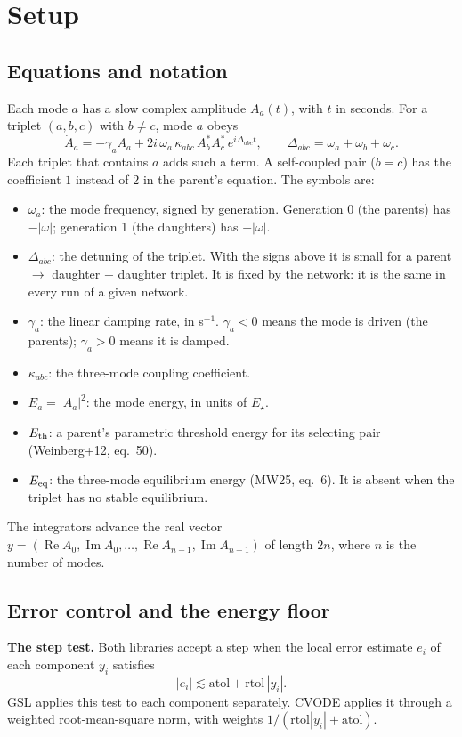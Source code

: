 \documentclass[10pt,a4paper]{article}
\newcommand{\atol}{\mathrm{atol}}
\newcommand{\rtol}{\mathrm{rtol}}
\newcommand{\Eth}{E_{\rm th}}
\newcommand{\Eeq}{E_{\rm eq}}
\begin{document}
\section{Setup}

\subsection{Equations and notation}
Each mode $a$ has a slow complex amplitude $A_a(t)$, with $t$ in seconds. For a triplet $(a,b,c)$ with $b\ne c$, mode $a$ obeys
\begin{equation}
    \dot A_a = -\gamma_a A_a + 2i\,\omega_a\,\kappa_{abc}\,A_b^*A_c^*\,e^{i\Delta_{abc}t},
    \qquad \Delta_{abc}=\omega_a+\omega_b+\omega_c .
\end{equation}
Each triplet that contains $a$ adds such a term. A self-coupled pair ($b=c$) has the coefficient $1$ instead of $2$ in the parent's equation. The symbols are:
\begin{itemize}
    \item $\omega_a$: the mode frequency, signed by generation. Generation 0 (the parents) has $-|\omega|$; generation 1 (the daughters) has $+|\omega|$.
    \item $\Delta_{abc}$: the detuning of the triplet. With the signs above it is small for a parent $\to$ daughter + daughter triplet. It is fixed by the network: it is the same in every run of a given network.
    \item $\gamma_a$: the linear damping rate, in s$^{-1}$. $\gamma_a<0$ means the mode is driven (the parents); $\gamma_a>0$ means it is damped.
    \item $\kappa_{abc}$: the three-mode coupling coefficient.
    \item $E_a=|A_a|^2$: the mode energy, in units of $E_\star$.
    \item $\Eth$: a parent's parametric threshold energy for its selecting pair (Weinberg+12, eq.~50).
    \item $\Eeq$: the three-mode equilibrium energy (MW25, eq.~6). It is absent when the triplet has no stable equilibrium.
\end{itemize}
The integrators advance the real vector $y=(\operatorname{Re}A_0,\operatorname{Im}A_0,\dots,\operatorname{Re}A_{n-1},\operatorname{Im}A_{n-1})$ of length $2n$, where $n$ is the number of modes.

\subsection{Error control and the energy floor}
\textbf{The step test.} Both libraries accept a step when the local error estimate $e_i$ of each component $y_i$ satisfies
\begin{equation}
    |e_i| \lesssim \atol + \rtol\,|y_i| .
\end{equation}
GSL applies this test to each component separately. CVODE applies it through a weighted root-mean-square norm, with weights $1/(\rtol|y_i|+\atol)$.
\end{document}
